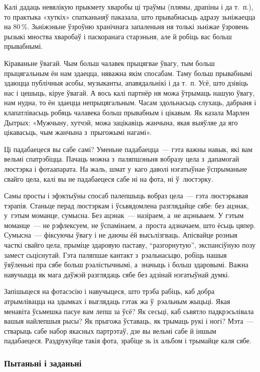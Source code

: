Калі дадаць невялікую прыкмету хваробы ці траўмы (плямы, драпіны і да т.~п.), то практыка «хуткіх» спатканьняў паказала, што прывабнасьць адразу зьніжаецца на 80\,\%. Зьніжэньне ўзроўню хранічнага запаленьня ня толькі зьніжае ўзровень рызыкі мноства хваробаў і паскоранага старэньня, але й робіць вас больш прывабнымі.

Кіраваньне ўвагай. Чым больш чалавек прыцягвае ўвагу, тым больш прыцягальным ён нам здаецца, няважна якім спосабам. Таму больш прывабнымі здаюцца публічныя асобы, музыканты, апавядальнікі і да т.~п. Усё, што дзівіць нас і цешыць, кіруе ўвагай. А вось калі партнёр ня можа ўтрымаць нашую ўвагу, нам нудна, то ён здаецца непрыцягальным. Часам здольнасьць слухаць, дабрыня і клапатлівасьць робяць чалавека больш прывабным і цікавым. Як казала Марлен Дытрых: «Мужчыну, хутчэй, можа зацікавіць жанчына, якая выяўляе да яго цікавасьць, чым жанчына з~прыгожымі нагамі».

Ці падабаецеся вы сабе самі? Уменьне падабаецца~--- гэта важны навык, які вам вельмі спатрэбіцца. Пачаць можна з~паляпшэньня вобразу цела з~дапамогай люстэрка і фотаапарата. На жаль, шмат у~каго даволі нэгатыўнае ўспрыманьне свайго цела, калі вы не падабаецеся сабе ні на фота, ні ў~люстэрку.

Самы просты і эфэктыўны спосаб палепшыць вобраз цела~--- гэта люстэркавая тэрапія. Станьце перад люстэркам і ўсьвядомлена разглядайце сябе: без ацэнак, у~гэтым моманце, сумысна. Без ацэнак~--- назіраем, а~не ацэньваем. У гэтым моманце~--- не рэфлексуем, не ўспамінаем, а~проста адзначаем, што ёсьць цяпер. Сумысна~--- фіксуючы ўвагу і не даючы ёй высьлізгваць. Апісвайце розныя часткі свайго цела, прыміце здаровую паставу, ``разгорнутую'', экспансіўную позу замест сьціснутай. Гэта паляпшае кантакт з~рэальнасьцю, робіць нашыя ўяўленьні пра сябе больш рэалістычнымі, а~значыць і больш здаровымі. Важна навучыцца як мага даўжэй разглядаць сябе без адзінай нэгатыўнай думкі.

Запішыцеся на фотасэсію і навучыцеся, што трэба рабіць, каб добра атрымлівацца на здымках і выглядаць гэтак жа ў~рэальным жыцьці. Якая менавіта ўсьмешка пасуе вам лепш за ўсё? Як сесьці, каб сьвятло падкрэсьлівала вашыя найлепшыя рысы? Як прыгожа ўставаць, як трымаць рукі і ногі? Мэта~--- стварыць сабе набор якасных партрэтаў, дзе вы вельмі сабе й іншым падабаецеся. Раздрукуйце такія фота, зрабіце зь іх альбом і трымайце каля сябе.

\subsubsection{Пытаньні і заданьні}

